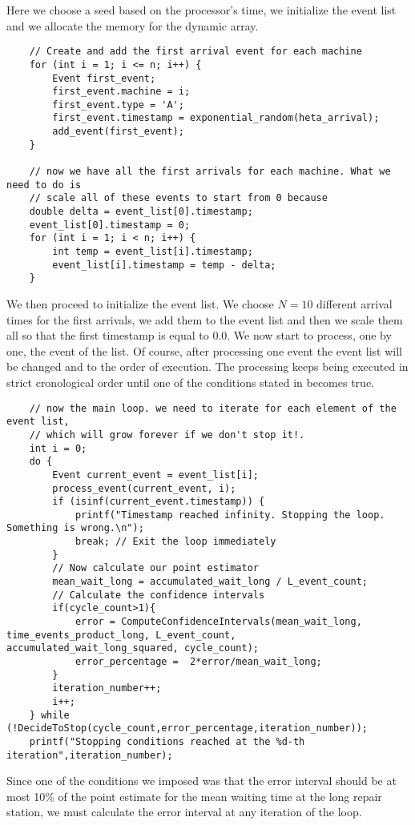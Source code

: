 \documentclass[12pt]{article}
\begin{document}
Here we choose a seed based on the processor's time, we initialize the event list and we allocate the memory for the dynamic array.
\begin{lstlisting}
	// Create and add the first arrival event for each machine
	for (int i = 1; i <= n; i++) {
		Event first_event;
		first_event.machine = i;
		first_event.type = 'A';
		first_event.timestamp = exponential_random(heta_arrival);
		add_event(first_event);
	}
	
	// now we have all the first arrivals for each machine. What we need to do is
	// scale all of these events to start from 0 because
	double delta = event_list[0].timestamp;
	event_list[0].timestamp = 0;
	for (int i = 1; i < n; i++) {
		int temp = event_list[i].timestamp;
		event_list[i].timestamp = temp - delta;
	}\end{lstlisting}
We then proceed to initialize the event list. We choose $N=10$ different arrival times for the first arrivals, we add them to the event list and then we scale them all so that the first timestamp is equal to 0.0. We now start to process, one by one, the event of the list. Of course, after processing one event the event list will be changed and to the order of execution. The processing keeps being executed in strict cronological order until one of the conditions stated in  becomes true.
\begin{lstlisting}
	// now the main loop. we need to iterate for each element of the event list,
	// which will grow forever if we don't stop it!.
	int i = 0;
	do {
		Event current_event = event_list[i];
		process_event(current_event, i);
		if (isinf(current_event.timestamp)) {
			printf("Timestamp reached infinity. Stopping the loop. Something is wrong.\n");
			break; // Exit the loop immediately
		}
		// Now calculate our point estimator
		mean_wait_long = accumulated_wait_long / L_event_count;
		// Calculate the confidence intervals
		if(cycle_count>1){
			error = ComputeConfidenceIntervals(mean_wait_long, time_events_product_long, L_event_count, accumulated_wait_long_squared, cycle_count);
			error_percentage =  2*error/mean_wait_long;
		}
		iteration_number++;
		i++;
	} while (!DecideToStop(cycle_count,error_percentage,iteration_number));
	printf("Stopping conditions reached at the %d-th iteration",iteration_number);
\end{lstlisting}
Since one of the conditions we imposed was that the error interval should be at most 10\% of the point estimate for the mean waiting time at the long repair station, we must calculate the error interval at any iteration of the loop.
\end{document}

